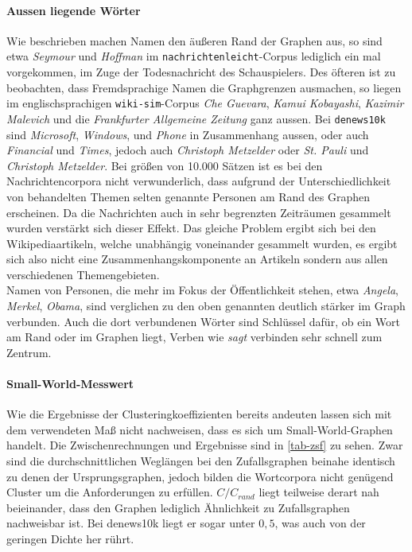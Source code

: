 \documentclass[11pt, a4paper]{article}
\begin{document}
\paragraph{Aussen liegende Wörter}
Wie beschrieben machen Namen den äußeren Rand der Graphen aus, so sind etwa \emph{Seymour} und \emph{Hoffman} im \texttt{nachrichtenleicht}-Corpus lediglich ein mal vorgekommen, im Zuge der Todesnachricht des Schauspielers. Des öfteren ist zu beobachten, dass Fremdsprachige Namen die Graphgrenzen ausmachen, so liegen im englischsprachigen \texttt{wiki-sim}-Corpus \emph{Che Guevara}, \emph{Kamui Kobayashi}, \emph{Kazimir Malevich} und die \emph{Frankfurter Allgemeine Zeitung} ganz aussen. Bei \texttt{denews10k} sind \emph{Microsoft}, \emph{Windows}, und \emph{Phone} in Zusammenhang aussen, oder auch \emph{Financial} und \emph{Times}, jedoch auch \emph{Christoph Metzelder} oder \emph{St. Pauli} und \emph{Christoph Metzelder}. Bei größen von 10.000 Sätzen ist es bei den Nachrichtencorpora nicht verwunderlich, dass aufgrund der Unterschiedlichkeit von behandelten Themen selten genannte Personen am Rand des Graphen erscheinen. Da die Nachrichten auch in sehr begrenzten Zeiträumen gesammelt wurden verstärkt sich dieser Effekt. Das gleiche Problem ergibt sich bei den Wikipediaartikeln, welche unabhängig voneinander gesammelt wurden, es ergibt sich also nicht eine Zusammenhangskomponente an Artikeln sondern aus allen verschiedenen Themengebieten.\\
Namen von Personen, die mehr im Fokus der Öffentlichkeit stehen, etwa \emph{Angela}, \emph{Merkel}, \emph{Obama}, sind verglichen zu den oben genannten deutlich stärker im Graph verbunden. Auch die dort verbundenen Wörter sind Schlüssel dafür, ob ein Wort am Rand oder im Graphen liegt, Verben wie \emph{sagt} verbinden sehr schnell zum Zentrum.

\paragraph{Small-World-Messwert}
Wie die Ergebnisse der Clusteringkoeffizienten bereits andeuten lassen sich mit dem verwendeten Maß nicht nachweisen, dass es sich um Small-World-Graphen handelt. Die Zwischenrechnungen und Ergebnisse sind in \ref{tab-zsf} zu sehen. Zwar sind die durchschnittlichen Weglängen bei den Zufallsgraphen beinahe identisch zu denen der Ursprungsgraphen, jedoch bilden die Wortcorpora nicht genügend Cluster um die Anforderungen zu erfüllen. $C/C_{rand}$ liegt teilweise derart nah beieinander, dass den Graphen lediglich Ähnlichkeit zu Zufallsgraphen nachweisbar ist. Bei denews10k liegt er sogar unter $0,5$, was auch von der geringen Dichte her rührt.
\end{document}
